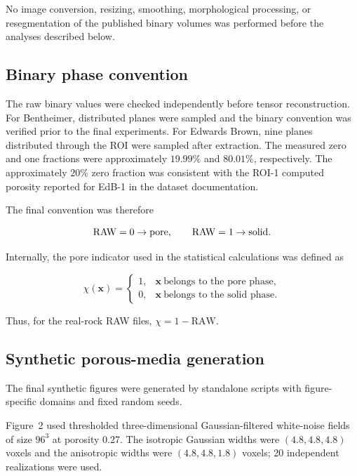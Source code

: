 \documentclass{article}
\begin{document}
No image conversion, resizing, smoothing, morphological processing, or resegmentation of the published binary volumes was performed before the analyses described below.

\subsection{Binary phase convention}
\label{sec:SI_phase}

The raw binary values were checked independently before tensor reconstruction. For Bentheimer, distributed planes were sampled and the binary convention was verified prior to the final experiments. For Edwards Brown, nine planes distributed through the ROI were sampled after extraction. The measured zero and one fractions were approximately $19.99\%$ and $80.01\%$, respectively. The approximately $20\%$ zero fraction was consistent with the ROI-1 computed porosity reported for EdB-1 in the dataset documentation.

The final convention was therefore

\begin{equation}
    {\rm RAW}=0 \rightarrow {\rm pore},
    \qquad
    {\rm RAW}=1 \rightarrow {\rm solid}.
    \label{eq:SI_phase}
\end{equation}

Internally, the pore indicator used in the statistical calculations was defined as

\begin{equation}
    \chi(\mathbf{x})=
    \begin{cases}
        1, & \mathbf{x}\ \textrm{belongs to the pore phase},\\
        0, & \mathbf{x}\ \textrm{belongs to the solid phase}.
    \end{cases}
\end{equation}

Thus, for the real-rock RAW files,
$\chi=1-\mathrm{RAW}$.

\subsection{Synthetic porous-media generation}
\label{sec:SI_synthetic}

The final synthetic figures were generated by standalone scripts with
figure-specific domains and fixed random seeds.

Figure~2 used thresholded three-dimensional Gaussian-filtered white-noise
fields of size $96^3$ at porosity 0.27. The isotropic Gaussian widths were
$(4.8,4.8,4.8)$ voxels and the anisotropic widths were
$(4.8,4.8,1.8)$ voxels; 20 independent realizations were used.
\end{document}
